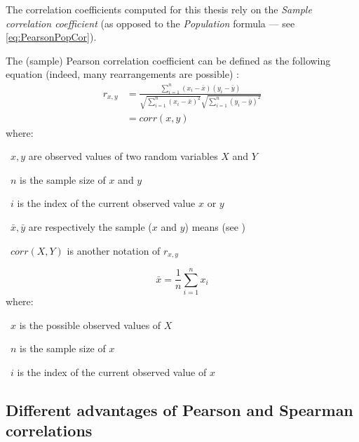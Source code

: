 The correlation coefficients computed for this thesis rely on the \emph{Sample
correlation coefficient} (as opposed to the \emph{Population}
formula --- see \cref{eq:PearsonPopCor}).

The (sample) Pearson correlation coefficient can be defined
as the following equation
(indeed, many rearrangements are possible) :
\begin{equation}\label{eq:PearsonCor}
    \tag{(Sample) Pearson correlation coefficient}
    \begin{split}
        r_{x,y} & = \frac{\sum ^n _{i=1}(x_i - \bar{x})(y_i - \bar{y})}{\sqrt{\sum ^n _{i=1}(x_i - \bar{x})^2}
        \sqrt{\sum ^n _{i=1}(y_i - \bar{y})^2}} \\
                & = corr(x,y)
    \end{split}
\end{equation}
where:
\quad\begin{eqlist}
    \item[\textbullet\ $x,y$] are observed values of two random variables $X$ and $Y$
    \item[\textbullet\ $n$] is the sample size of $x$ and $y$
    \item[\textbullet\ $i$] is the index of the current observed value $x$ or $y$
    \item[\textbullet\ $\bar{x}, \bar{y}$] are respectively the sample ($x$ and $y$) means (see )
    \item[\textbullet\ $corr(X,Y)$] is another notation of $r_{x,y}$
\end{eqlist}

\begin{equation}\label{eq:mean}
    \tag{Mean}
    \bar{x}=\frac{1}{n}\sum_{i=1}^n x_i
\end{equation}
where:
\quad\begin{eqlist}
    \item[\textbullet\ $x$] is the possible observed values of $X$
    \item[\textbullet\ $n$] is the sample size of $x$
    \item[\textbullet\ $i$] is the index of the current observed value of $x$
\end{eqlist}


\subsection{Different advantages of Pearson and Spearman correlations}\label{subsec:PearsonVsSpearman}

